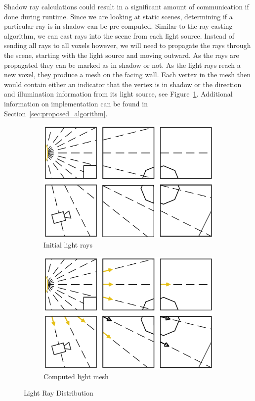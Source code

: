 Shadow ray calculations could result in a significant amount of communication if
done during runtime.  Since we are looking at static scenes, determining if a 
particular ray is in shadow can be pre-computed.  Similar to the ray casting 
algorithm, we can cast rays into the scene from each light source.  Instead of 
sending all rays to all voxels however, we will need to propagate the rays 
through the scene, starting with the light source and moving outward.  As the 
rays are propagated they can be marked as in shadow or not.  As the light rays 
reach a new voxel, they produce a mesh on the facing wall.  Each vertex in the 
mesh then would contain either an indicator that the vertex is in shadow or the 
direction and illumination information from its light source, 
see Figure~\ref{fig:light}.  Additional information on implementation can be 
found in Section~\ref{sec:proposed_algorithm}.

\begin{figure}[!htb]
\centering
\begin{subfigure}{0.49\textwidth}
 \centering
  \includegraphics[width=.98\columnwidth]{drawings/Lights1.pdf}
  \caption{Initial light rays}
\end{subfigure}
\begin{subfigure}{0.49\textwidth}
 \centering
  \includegraphics[width=.98\columnwidth]{drawings/Lights2.pdf}
  \caption{Computed light mesh}
\end{subfigure}
\caption{Light Ray Distribution}
\label{fig:light}
\end{figure}

